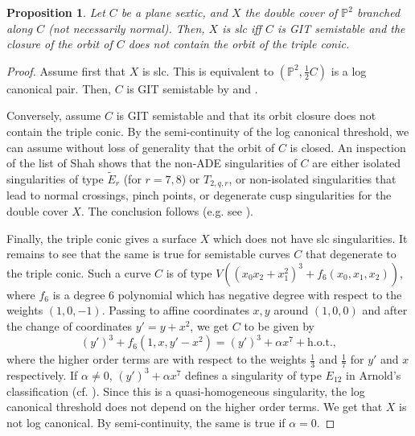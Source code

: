 \documentclass{amsart}
\numberwithin{equation}{section}
\theoremstyle{plain}
\newtheorem{proposition}[equation]{Proposition}
\theoremstyle{remark}
\theoremstyle{definition}
\newcommand{\bP}{\mathbb{P}}
\begin{document}
\begin{proposition}\label{propslc}
Let $C$ be a plane sextic, and $X$ the double cover of $\bP^2$ branched along $C$ (not necessarily normal). Then, $X$ is slc iff $C$ is GIT semistable and the closure of the orbit of $C$ does not contain the orbit of the triple conic. 
\end{proposition}
\begin{proof}
Assume first that $X$ is slc. This is equivalent to $(\bP^2, \frac{1}{2} C)$ is a log canonical pair. Then, $C$ is GIT semistable by \cite{kimlee} and \cite[\S10]{hacking}.

Conversely, assume $C$ is GIT semistable and that its orbit closure does not contain the triple conic. By the semi-continuity of the log canonical threshold, we can assume without loss of generality that  the orbit of $C$ is closed. An inspection of the  list of Shah \cite[Thm. 2.1]{shah} shows that the non-ADE singularities of $C$ are either isolated singularities of type  $\widetilde E_r$ (for $r=7,8$) or $T_{2,q,r}$,  or non-isolated singularities that lead to normal crossings, pinch points, or degenerate cusp singularities  for  the double cover $X$. The conclusion follows (e.g. see \cite[Thm. 4.21]{ksb}).


Finally, the triple conic gives a surface $X$  which does not have slc singularities. It remains to see that the same is true for semistable curves $C$ that degenerate to the triple conic. Such a curve $C$ is of type $V((x_0x_2+x_1^2)^3+f_6(x_0,x_1,x_2))$, 
where $f_6$ is a  degree $6$ polynomial which has negative degree with respect to the weights $(1,0,-1)$. Passing to affine coordinates $x,y$ around $(1,0,0)$ and after the change of coordinates $y'=y+x^2$, we get  $C$ to be given by
$$(y')^3+f_6(1,x,y'-x^2)=(y')^3+\alpha x^7+\textrm{h.o.t.},$$
where the higher order terms are with respect to the weights $\frac{1}{3}$ and $\frac{1}{7}$ for $y'$ and $x$ respectively. If $\alpha\neq 0$,  $(y')^3+\alpha x^7$ defines a singularity of type $E_{12}$ in Arnold's classification (cf. \cite[\S16.2.$7_2$]{agzv1}). Since this is a quasi-homogeneous singularity,   the log canonical threshold does not depend on the higher order terms.  We get that $X$ is not log canonical. By semi-continuity, the same is true if $\alpha=0$. 
\end{proof}

\end{document}
